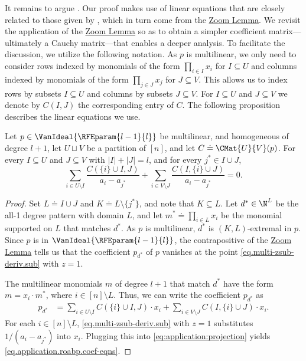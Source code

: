 It remains to argue . Our proof makes use of linear equations that are closely related to those given by , which in turn come from the \hyperref[lem.multi-zsub-deriv]{Zoom Lemma}. We revisit the application of the \hyperref[lem.multi-zsub-deriv]{Zoom Lemma} so as to obtain a simpler coefficient matrix---ultimately a Cauchy matrix---that enables a deeper analysis. To facilitate the discussion, we utilize the following notation. As $p$ is multilinear, we only need to consider rows indexed by monomials of the form $\prod_{i \in I} x_i$ for $I \subseteq U$ and columns indexed by monomials of the form $\prod_{j \in J} x_j$ for $J \subseteq V$. This allows us to index rows by subsets $I \subseteq U$ and columns by subsets $J \subseteq V$. For $I \subseteq U$ and $J \subseteq V$ we denote by $C(I,J)$ the corresponding entry of $C$. The following proposition describes the linear equations we use.
\begin{proposition}
  \label{prop.application.roabp.coef-eqns}
  Let \(p\in\VanIdeal{\RFEparam{l-1}{l}}\) be multilinear,
  and homogeneous of degree \(l+1\),
  let \(U\sqcup V\) be a partition of \([n]\),
  and let $C \doteq \CMat{U}{V}(p)$.
  For every \(I\subseteq U\) and \(J\subseteq V\)
  with \(|I|+|J|=l\),
  and for every \(j^*\in I\cup J\),
  \begin{equation}
    \label{eq.application.roabp.coef-eqns}
    \sum_{i\in U\setminus I}
      \frac{C(\{i\}\cup I, J)}%
        {a_i - a_{j^*}}
    +
    \sum_{i\in V\setminus J}
      \frac{C(I,\{i\}\cup J)}%
        {a_i - a_{j^*}}
    =0.
  \end{equation}
\end{proposition}
\begin{proof}
  Set
  $L \doteq I \cup J$ and
  $K \doteq L \setminus \{j^*\}$,
  and note that \(K \subseteq L\).
  Let \(d^* \in \N^L\) be the all-1 degree pattern with domain \(L\),
  and let \({m}^* \doteq \prod_{i\in L} x_i\)
  be the monomial supported on \(L\) that matches \(d^*\).
  As $p$ is multilinear,
  $d^*$ is $(K,L)$-extremal in $p$.
  Since \(p\) is in \(\VanIdeal{\RFEparam{l-1}{l}}\),
  the contrapositive of the \hyperref[lem.multi-zsub-deriv]{Zoom Lemma} tells us that the
  coefficient \(p_{d^*}\) of \(p\) vanishes at the point
  \eqref{eq.multi-zsub-deriv.sub} with $z=1$.

  The multilinear monomials $m$ of degree $l+1$ that match
  \(d^*\) have the form $m = x_i \cdot {m}^*$,
  where $i \in [n] \setminus L$.
  Thus, we can write the coefficient \(p_{d^*}\) as
  \begin{align}\label{eq:application:projection}
    p_{d^*}
    & =
    \sum_{i \in U\setminus I} C(\{i\} \cup I,J) \cdot x_i +
    \sum_{i \in V\setminus J} C(I,\{i\} \cup J) \cdot x_i.
  \end{align}
  For each \(i \in [n]\setminus L\),
  \eqref{eq.multi-zsub-deriv.sub} with $z=1$ substitutes $1/(a_i - a_{j^*})$
  into \(x_i\).
  Plugging this into \eqref{eq:application:projection} yields
  \eqref{eq.application.roabp.coef-eqns}.
\end{proof}

